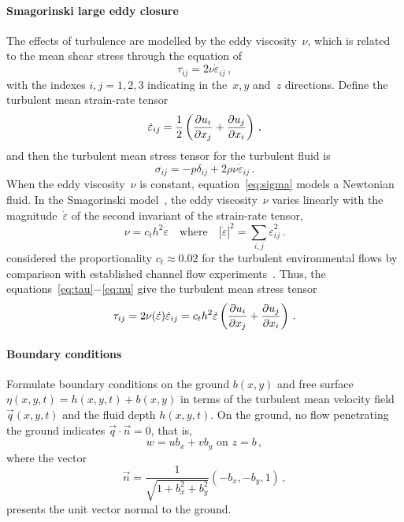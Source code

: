 \documentclass[12pt,a5paper]{article}
\newcommand{\ros}{{\dot\varepsilon}}
\begin{document}
\paragraph{Smagorinski large eddy closure} The effects of turbulence are modelled by the eddy viscosity~$\nu$, which is related to the mean shear stress through the equation of
\begin{equation}
\tau_{ij}=2\nu\ros_{ij}\,,\label{eq:tau}
\end{equation}
with the indexes $i,j=1,2,3$ indicating in the~$x, y$ and~$z$ directions.
Define the turbulent mean strain-rate tensor~\cite[e.g.]{Roberts2008,Georgiev2008}
\begin{equation}
	\ros_{ij} =\frac12\left( \D{x_j}{u_i} +\D{x_i}{u_j}\right) \,,\label{eq:strainrate}
\end{equation}
and then the turbulent mean stress tensor for the turbulent fluid is
\begin{equation}
\sigma_{ij}=-p\delta_{ij}+2\rho\nu\ros_{ij}\,.\label{eq:sigma}
\end{equation}
When the eddy viscosity~$\nu$ is constant, equation~\eqref{eq:sigma} models a Newtonian fluid.
In the Smagorinski model~\cite[e.g.]{Ozgokmen2007a}, the eddy viscosity~$\nu$ varies linearly with the magnitude~$\ros$ of the second invariant of the strain-rate tensor,
\begin{equation}
  \nu=c_th^2\ros\quad\text{where}\quad |\ros|^2=\sum_{i,j}\ros_{ij}^2\,.\label{eq:nu}
\end{equation}
\cite{Roberts2008} considered the proportionality $c_t\approx0.02$ for the turbulent environmental flows by comparison with established channel flow experiments~\cite[e.g.]{Nezu2005}.
Thus, the equations~\eqref{eq:tau}$-$\eqref{eq:nu} give the turbulent mean stress tensor
\begin{equation}
\tau_{ij}=2\nu(\ros)\ros_{ij}=c_th^2\ros\left( \D{x_j}{u_i} +\D{x_i}{u_j}\right) \,.\label{eq:stress}
\end{equation}

\paragraph{Boundary conditions} Formulate boundary conditions on the ground $b(x,y)$ and free surface $\eta(x,y,t)=h(x,y,t)+b(x,y)$ in terms of the turbulent mean velocity field $\vec q(x,y,t)$ and the fluid depth $h(x,y,t)$. 
On the ground, no flow penetrating the ground indicates $\vec q\cdot\vec n=0$, that is,
\begin{equation}
w=ub_x+vb_y \text{ on } z=b\,,
\label{eq:nopen}
\end{equation}
where the vector
\begin{equation}
\vec n=\frac{1}{\sqrt{1+b_x^2+b_y^2}}(-b_x,-b_y,1)\,,\label{eq:vecn}
\end{equation} 
presents the unit vector normal to the ground.  
\end{document}

